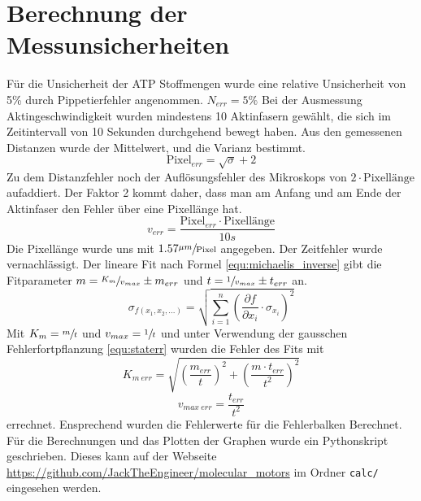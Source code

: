 \section{Berechnung der Messunsicherheiten}
Für die Unsicherheit der ATP Stoffmengen wurde eine relative Unsicherheit
von 5\% durch Pippetierfehler angenommen. $N_{err} = 5 \%$
Bei der Ausmessung Aktingeschwindigkeit wurden mindestens 10 Aktinfasern gewählt,
die sich im Zeitintervall von 10 Sekunden durchgehend bewegt haben.
Aus den gemessenen Distanzen wurde der Mittelwert, und die Varianz bestimmt.
\[
  \text{Pixel}_{err} = \sqrt{\sigma} + 2
\]
Zu dem Distanzfehler noch der Auflösungsfehler des Mikroskops
von $2 \cdot \text{Pixellänge}$ aufaddiert. Der Faktor 2 kommt daher,
dass man am Anfang und am Ende der Aktinfaser den Fehler über eine Pixellänge hat.
\[
  v_{err} = \frac{\text{Pixel}_{err} \cdot \text{Pixellänge}}{10s}
\]
Die Pixellänge wurde uns mit $1.57\sfrac{\mu m}{\text{Pixel}}$ angegeben.
Der Zeitfehler wurde vernachlässigt.
Der lineare Fit nach Formel \ref{equ:michaelis_inverse} gibt die Fitparameter
$m = \sfrac{K_m}{v_{max}} \pm m_{err}$ und $t = \sfrac{1}{v_{max}} \pm t_{err}$ an.
\begin{equation}
	\sigma_{f(x_1,x_2,...)} = \sqrt{\sum\limits_{i=1}^n (\frac{\partial f}{\partial x_i} \cdot \sigma_{x_i})^2}
	\label{equ:staterr}
\end{equation}
Mit $K_m = \sfrac{m}{t}$ und $v_{max} = \sfrac{1}{t}$ und unter Verwendung der
gausschen Fehlerfortpflanzung \ref{equ:staterr} wurden die
Fehler des Fits mit
\[
  K_{m\ err} = \sqrt{(\frac{m_{err}}{t})^2 + (\frac{m \cdot t_{err}}{t^2})^2}
\] 
\[
  v_{max\ err} = \frac{t_{err}}{t^2}
\]
errechnet.
Ensprechend wurden die Fehlerwerte für die Fehlerbalken Berechnet.
Für die Berechnungen und das Plotten der Graphen wurde ein Pythonskript geschrieben.
Dieses kann auf der Webseite \url{https://github.com/JackTheEngineer/molecular_motors}
im Ordner \texttt{calc/} eingesehen werden.

